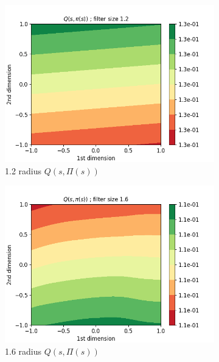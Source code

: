 \documentclass{article}
\begin{document}
\begin{figure}[H]
   \begin{subfigure}[b]{0.3\linewidth}
    \includegraphics[width=\linewidth]{Study_2/2.4/visualizations/Q_contour_1_2.png}
      \caption{1.2 radius $Q(s, \Pi(s))$}
  \end{subfigure}
   \begin{subfigure}[b]{0.3\linewidth}
    \includegraphics[width=\linewidth]{Study_2/2.4/visualizations/Q_contour_1_6.png}
      \caption{1.6 radius $Q(s, \Pi(s))$}
  \end{subfigure}
   \begin{subfigure}[b]{0.3\linewidth}

\end{subfigure}
\end{figure}
\end{document}
